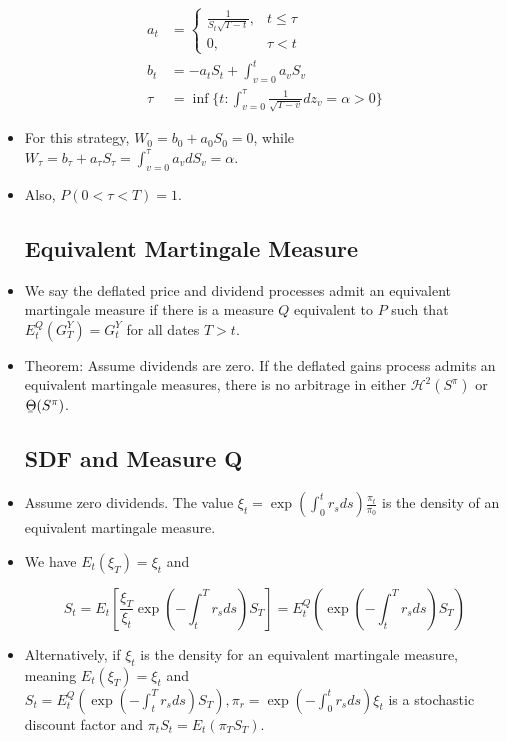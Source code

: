 \documentclass{article}
\newcommand{\ubar}[1]{\underaccent{\bar}{#1}}
\begin{document}
\begin{itemize}
\begin{align*}
a_t &= 
\begin{cases}
\frac{1}{S_t \sqrt{T - t}}, & t \le \tau \\
0, & \tau < t
\end{cases}\\
b_t &= -a_t S_t + \int_{v=0}^t a_v S_v\\
\tau &= \inf \{t: \int_{v = 0}^\tau \frac{1}{\sqrt{T - v}} dz_v = \alpha > 0 \}
\end{align*}

\item For this strategy, $W_0 = b_0 + a_0 S_0 = 0$, while $W_\tau = b_\tau + a_\tau S_\tau = \int_{v=0}^\tau a_v dS_v = \alpha$.

\item Also, $P(0 < \tau < T) = 1$.

\subsection*{Equivalent Martingale Measure}

\item We say the deflated price and dividend processes admit an equivalent martingale measure if there is a measure $Q$ equivalent to $P$ such that $E_t^Q (G^Y_T) = G^Y_t$ for all dates $T > t$.

\item Theorem: Assume dividends are zero. If the deflated gains process admits an equivalent martingale measures, there is no arbitrage in either $\mathcal{H}^2(S^\pi)$ or $\ubar{\Theta}(S^{\pi})$.


\subsection*{SDF and Measure Q}

\item Assume zero dividends. The value $\xi_t = \exp (\int_0^t r_s ds) \frac{\pi_t}{\pi_0}$ is the density of an equivalent martingale measure.

\item We have $E_t(\xi_T) =\xi_t$ and 

$$
S_t  = E_t [\frac{\xi_T}{\xi_t} \exp (-\int_t^T r_s ds) S_T] = E_t^Q (\exp(-\int_t^T r_s ds) S_T)
$$


\item Alternatively, if $\xi_t$ is the density for an equivalent martingale measure, meaning $E_t (\xi_T) = \xi_t$ and $S_t = E_t^Q(\exp(-\int_t^T r_s ds) S_T), \pi_r = \exp (-\int_0^t r_s ds) \xi_t$ is a stochastic discount factor and $\pi_t S_t = E_t (\pi_T S_T)$.


\end{itemize}
\end{document}
